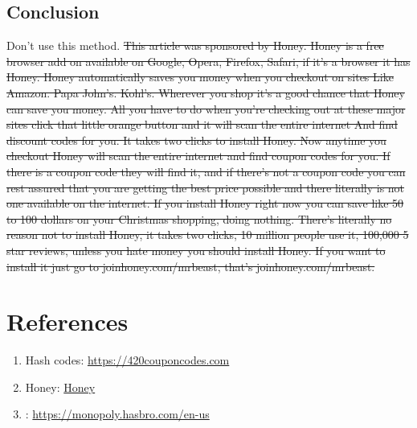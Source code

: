 \documentclass{article}
\newcommand{\M}{\rotatebox[origin=c]{180}{\textwon}}
\begin{document}
\begin{multicols}{2}
\section{Conclusion}

Don't use this method. \sout{This article was sponsored by Honey. Honey is a free browser add on available on Google, Opera, Firefox, Safari, if it’s a browser it has Honey. Honey automatically saves you money when you checkout on sites Like Amazon. Papa John's. Kohl's. Wherever you shop it's a good chance that Honey can save you money. All you have to do when you're checking out at these major sites click that little orange button and it will scan the entire internet And find discount codes for you. It takes two clicks to install Honey. Now anytime you checkout Honey will scan the entire internet and find coupon codes for you. If there is a coupon code they will find it, and if there’s not a coupon code you can rest assured that you are getting the best price possible and there literally is not one available on the internet. If you install Honey right now you can save like 50 to 100 dollars on your Christmas shopping, doing nothing. There’s literally no reason not to install Honey, it takes two clicks, 10 million people use it, 100,000 5 star reviews, unless you hate money you should install Honey. If you want to install it just go to joinhoney.com/mrbeast, that’s joinhoney.com/mrbeast.} 


\end{multicols}

\section{References}

\begin{enumerate}
	\item Hash codes: \href{https://420couponcodes.com}{https://420couponcodes.com}
	\item Honey: \href{https://en.wikipedia.org/wiki/Honey}{Honey}
	\item \M: \href{https://monopoly.hasbro.com/en-us}{https://monopoly.hasbro.com/en-us}
\end{enumerate}
\end{document}
